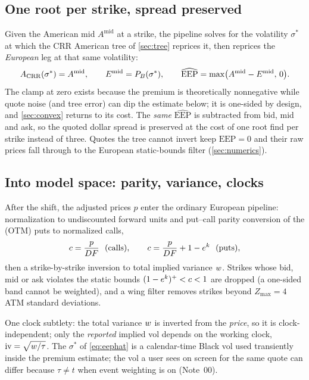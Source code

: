 \documentclass[11pt]{article}
\begin{document}
\subsection{One root per strike, spread preserved}
\label{sec:eephat}

Given the American mid $A^{\mathrm{mid}}$ at a strike, the pipeline solves for
the volatility $\sigma^*$ at which the CRR American tree of \cref{sec:tree}
reprices it, then reprices the \emph{European} leg at that same volatility:
\begin{equation}
A_{\mathrm{CRR}}(\sigma^*)=A^{\mathrm{mid}},\qquad
E^{\mathrm{mid}}=P_{B}(\sigma^*),\qquad
\widehat{\mathrm{EEP}}=\max\!\big(A^{\mathrm{mid}}-E^{\mathrm{mid}},\,0\big).
\label{eq:eephat}
\end{equation}
The clamp at zero exists because the premium is theoretically nonnegative while
quote noise (and tree error) can dip the estimate below; it is one-sided by
design, and \cref{sec:convex} returns to its cost. The \emph{same}
$\widehat{\mathrm{EEP}}$ is subtracted from bid, mid and ask, so the quoted
dollar spread is preserved at the cost of one root find per strike instead of
three. Quotes the tree cannot invert keep $\widehat{\mathrm{EEP}}=0$ and their
raw prices fall through to the European static-bounds filter
(\cref{sec:numerics}).

\subsection{Into model space: parity, variance, clocks}

After the shift, the adjusted prices $p$ enter the ordinary European pipeline:
normalization to undiscounted forward units and put--call parity conversion of
the (OTM) puts to normalized calls,
\begin{equation}
c=\frac{p}{D\fwd}\ \ \text{(calls)},\qquad
c=\frac{p}{D\fwd}+1-e^{\logm}\ \ \text{(puts)},
\label{eq:parity}
\end{equation}
then a strike-by-strike inversion to total implied variance $w$. Strikes
whose bid, mid or ask violates the static bounds $(1-e^{k})^+<c<1$ are
dropped (a one-sided band cannot be weighted), and a wing filter removes strikes
beyond $Z_{\max}=4$ ATM standard deviations.

One clock subtlety: the total variance $w$ is inverted from the
\emph{price}, so it is clock-independent; only the \emph{reported} implied vol
depends on the working clock, $\text{iv}=\sqrt{w/\tau}$. The
$\sigma^*$ of \cref{eq:eephat} is a calendar-time Black vol used transiently
inside the premium estimate; the vol a user sees on screen for the same quote can
differ because $\tau\ne t$ when event weighting is on (Note~00).
\end{document}
